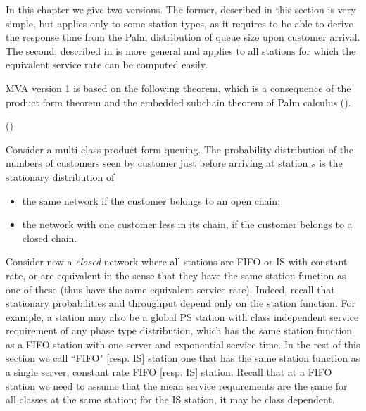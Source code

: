 In this chapter we give two versions. The former,
described in this section is very simple, but
applies only to some station types, as it
requires to be able to derive the response time
from the Palm distribution of queue size upon
customer arrival. The second, described in
 is more general and applies to
all stations for which the equivalent service
rate can be computed easily.

MVA version 1 is based on the following theorem,
which is a consequence of the product form
theorem and the embedded subchain theorem of Palm
calculus ().

\begin{shadethm}()

Consider a multi-class product form queuing. The probability
distribution of the numbers of customers seen by customer just
before arriving at station $s$ is the stationary distribution
of
\begin{itemize}
    \item the same network
if the customer belongs to an open chain;
    \item the network with one customer less in
    its chain, if the customer belongs to a closed
    chain.
\end{itemize}\label{theo-arrival}
\end{shadethm}

Consider now a \emph{closed} network where all
stations are FIFO or IS with constant rate, or
are equivalent in the sense that they have the same
station function as one of these (thus have the same equivalent service rate). Indeed, recall
that stationary probabilities and throughput
depend only on the station function. For example,
a station may also be a global PS station with
class independent service requirement of any
phase type distribution, which has the same
station function as a FIFO station with one
server and exponential service time. In the rest
of this section we call ``FIFO" [resp. IS]
station one that has the same station function as
a single server, constant rate FIFO [resp. IS]
station. Recall that at a FIFO station we need to
assume that the mean service requirements are the
same for all classes at the same station; for the
IS station, it may be class dependent.

